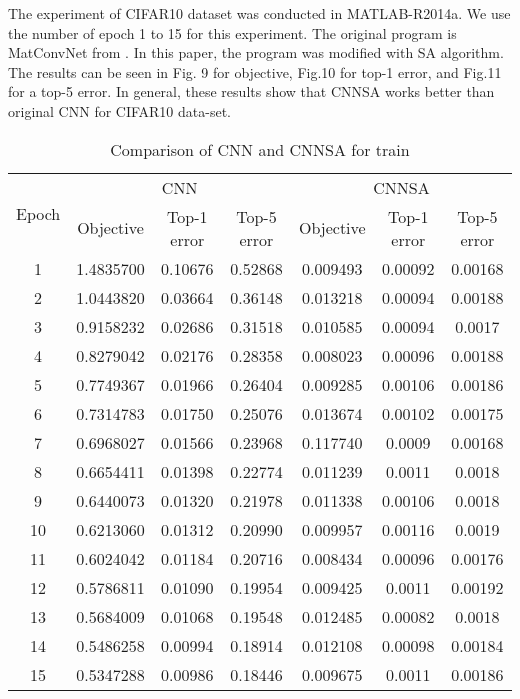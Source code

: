 \documentclass[10pt,letterpaper]{article}
\begin{document}
The experiment of CIFAR10 dataset was conducted in MATLAB-R2014a. We use the number of epoch 1 to 15 for this experiment. The original program is MatConvNet from \cite{vedaldi15matconvnet}. In this paper, the program was modified with SA algorithm. The results can be seen in Fig. 9 for objective, Fig.10 for top-1 error, and Fig.11 for a top-5 error. In general, these results show that CNNSA works better than original CNN for CIFAR10 data-set.


\begin{table}[]
\small
\caption{Comparison of CNN and CNNSA for train}
\label{tab:my_label}

\begin{tabular}{c c c c c c c}
\hline
\multicolumn{1}{c}{\multirow{2}{*}{Epoch}} & \multicolumn{3}{c}{CNN} &
\multicolumn{3}{c}{CNNSA}\\
\cline{2-7}

\multicolumn{1}{r}{}     & \multicolumn{1}{c}{Objective} & \multicolumn{1}{c}{Top-1 error} & \multicolumn{1}{c}{Top-5 error} &
\multicolumn{1}{c}{Objective} & \multicolumn{1}{c}{Top-1 error} & \multicolumn{1}{c}{Top-5 error}\\
\hline

1		& 1.4835700   & 0.10676    & 0.52868    & 0.009493  & 0.00092    & 0.00168        \\
2 		& 1.0443820   & 0.03664    & 0.36148    & 0.013218  & 0.00094    & 0.00188         \\
3		& 0.9158232   & 0.02686    & 0.31518    & 0.010585  & 0.00094    & 0.0017        \\
4		& 0.8279042   & 0.02176    & 0.28358    & 0.008023  & 0.00096    & 0.00188   	  \\
5		& 0.7749367   & 0.01966    & 0.26404    & 0.009285  & 0.00106    & 0.00186        \\
6		& 0.7314783   & 0.01750    & 0.25076    & 0.013674  & 0.00102    & 0.00175        \\
7 		& 0.6968027   & 0.01566    & 0.23968    & 0.117740  & 0.0009     & 0.00168        \\
8		& 0.6654411   & 0.01398    & 0.22774    & 0.011239  & 0.0011     & 0.0018        \\
9		& 0.6440073   & 0.01320    & 0.21978    & 0.011338  & 0.00106    & 0.0018        \\
10		& 0.6213060   & 0.01312    & 0.20990    & 0.009957  & 0.00116    & 0.0019        \\
11		& 0.6024042   & 0.01184    & 0.20716    & 0.008434  & 0.00096    & 0.00176        \\
12 		& 0.5786811   & 0.01090    & 0.19954    & 0.009425  & 0.0011     & 0.00192          \\
13		& 0.5684009   & 0.01068    & 0.19548    & 0.012485  & 0.00082    & 0.0018        \\
14		& 0.5486258   & 0.00994    & 0.18914    & 0.012108  & 0.00098    & 0.00184   	  \\
15		& 0.5347288   & 0.00986    & 0.18446    & 0.009675  & 0.0011     & 0.00186       \\

\hline
\end{tabular}
\end{table}
\end{document}
